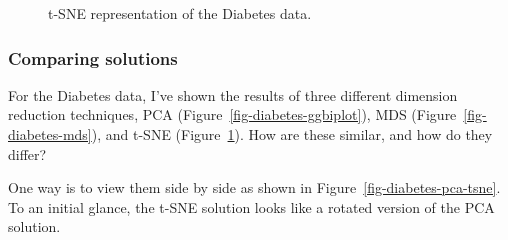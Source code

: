 \documentclass[
  letterpaper,
  10pt,
  krantz2]{krantz}
\begin{document}
{\begin{figure}[H]


\caption{\label{fig-diabetes-tsne}t-SNE representation of the Diabetes
data.}

\end{figure}%

\subsubsection{Comparing solutions}\label{compare-solutions}

For the Diabetes data, I've shown the results of three different
dimension reduction techniques, PCA
(Figure~\ref{fig-diabetes-ggbiplot}), MDS
(Figure~\ref{fig-diabetes-mds}), and t-SNE
(Figure~\ref{fig-diabetes-tsne}). How are these similar, and how do they
differ?

One way is to view them side by side as shown in
Figure~\ref{fig-diabetes-pca-tsne}. To an initial glance, the t-SNE
solution looks like a rotated version of the PCA solution.

\begin{figure}

\end{figure}}
\end{document}
